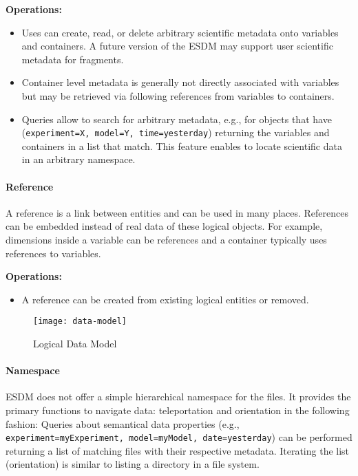 \textbf{Operations:}
\begin{itemize}
	\item Uses can create, read, or delete arbitrary scientific metadata onto variables and containers.
	A future version of the ESDM may support user scientific metadata for fragments.
	\item Container level metadata is generally not directly associated with variables but may be retrieved via following references from variables to containers.
	\item Queries allow to search for arbitrary metadata, e.g., for objects that have (\texttt{experiment=X, model=Y, time=yesterday}) returning the variables and containers in a list that match. This feature enables to locate scientific data in an arbitrary namespace.
\end{itemize}

\paragraph{Reference}
A reference is a link between entities and can be used in many places. References can be embedded instead of real data of these logical objects.
For example, dimensions inside a variable can be references and a container typically uses references to variables.

\textbf{Operations:}
\begin{itemize}
	\item A reference can be created from existing logical entities or removed.
\end{itemize}






\begin{figure}
	\centering
	\texttt{[image: data-model]}
	\caption{Logical Data Model}
	\label{fig:data-model}
\end{figure}

\paragraph{Namespace}

ESDM does not offer a simple hierarchical namespace for the files.
It provides the primary functions to navigate data: teleportation and orientation in the following fashion:
Queries about semantical data properties (e.g., \texttt{experiment=myExperiment, model=myModel, date=yesterday}) can be performed returning a list of matching files with their respective metadata.
Iterating the list (orientation) is similar to listing a directory in a file system.

